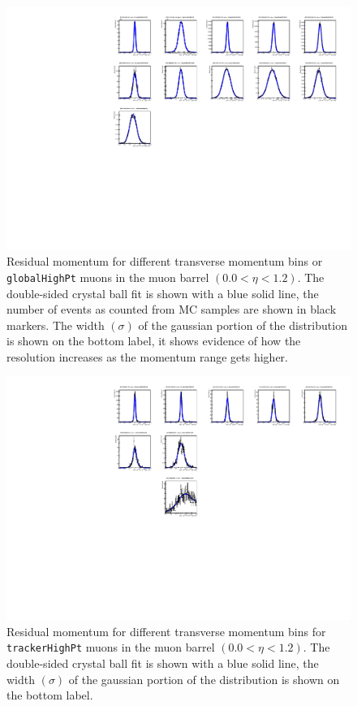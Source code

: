 \begin{figure}[tph]
  \centering
  \includegraphics[width=.9\textwidth]{fig/MomentumResolution/2016_HPResB_G_.pdf}
  \caption{Residual momentum for different transverse momentum bins
    or \texttt{globalHighPt} muons in the muon barrel $(0.0<\eta<1.2)$.
    The double-sided crystal ball fit is shown with a blue solid line,
    the number of events as counted from MC samples are shown in black markers.
    The width $(\sigma)$ of the gaussian portion of the distribution is
    shown on the bottom label, it shows evidence of how the resolution
    increases as the momentum range gets higher.}
  \label{fig:MomentumResolutionBins_Barrel_Global}
\end{figure}

\begin{figure}[tph]
  \centering
  \includegraphics[width=.9\textwidth]{fig/MomentumResolution/2016_HPResB_T_.pdf}
  \caption{Residual momentum for different transverse momentum bins
    for \texttt{trackerHighPt} muons in the muon barrel $(0.0<\eta<1.2)$.
    The double-sided crystal ball fit is shown with a blue solid line,
    the width $(\sigma)$ of the gaussian portion of the distribution is
    shown on the bottom label.}
  \label{fig:MomentumResolutionBins_Barrel_Tracker}
\end{figure}

